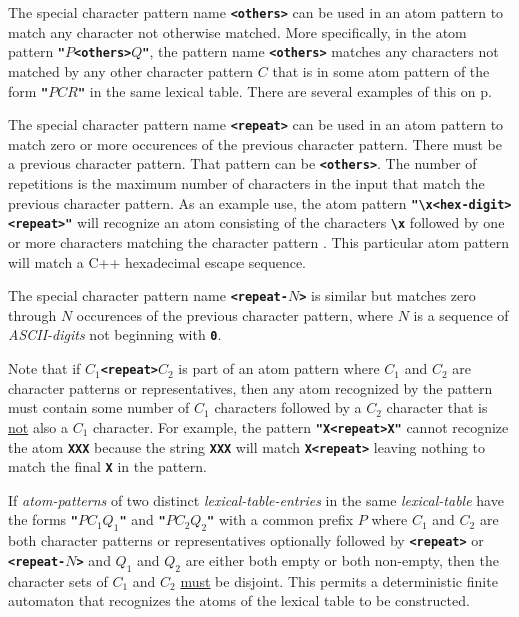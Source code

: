 \documentclass[12pt]{article}
\newcommand{\TT}[1]{{\tt \bfseries #1}}
\newcommand{\pagref}[1]{p\pageref{#1}}
\begin{document}
The special character pattern name
\TT{<{others}>}%
%
\label{<OTHERS>}
can be used in an atom pattern to match any character not otherwise
matched.  More specifically, in the atom pattern
\TT{"}$P$\TT{<others>}$Q$\TT{"},
the pattern name \TT{<others>} matches any characters not matched by
any other character pattern $C$ that is in some atom pattern of the form
\TT{"}$PCR$\TT{"} in the same lexical table.
There are several examples of this on \pagref{EXAMPLE-LEXEME-PROGRAM}.

The special character pattern name
\TT{<{repeat}>}%
%
\label{<REPEAT>}
can be used in an atom pattern to match zero or more occurences of
the previous character pattern.  There must be a previous character
pattern.  That pattern can be \TT{<others>}.
The number of repetitions is the maximum number of characters in
the input that match the previous character pattern.
As an example use, the atom pattern \TT{"\textbackslash x<hex-digit><repeat>"}
will recognize an atom consisting of the characters \TT{\textbackslash x}
followed by one or more characters matching the character pattern
\TT{<hex-digit>}.  This particular atom pattern will match a C++
hexadecimal escape sequence.

The special character pattern name
\TT{<{repeat-$N$}>}%
%
is similar but matches zero through $N$ occurences of the previous
character pattern, where $N$ is a sequence of {\em ASCII-digits}
not beginning with \TT{0}.

Note that if \TT{$C_1$<repeat>$C_2$} is part of an atom pattern where
$C_1$ and $C_2$ are character patterns or representatives, then
any atom recognized by the pattern must contain some number of
$C_1$ characters followed by a $C_2$ character that is \underline{not} also
a $C_1$ character.
For example, the pattern
\TT{"X<repeat>X"} cannot recognize the atom \TT{XXX} because the
string \TT{XXX} will match \TT{X<repeat>} leaving nothing to match
the final \TT{X} in the pattern.

If {\em atom-patterns} of two distinct {\em lexical-table-entries}
in the same {\em lexical-table} have the forms 
\TT{"}$PC_1Q_1$\TT{"} and \TT{"}$PC_2Q_2$\TT{"} with a common
prefix $P$ where
$C_1$ and $C_2$ are both character patterns or representatives
optionally followed
by \TT{<repeat>} or \TT{<repeat-$N$>} and
$Q_1$ and $Q_2$ are either both empty or both non-empty,
then the character sets of $C_1$ and $C_2$ \underline{must}
be disjoint.  This permits a deterministic finite automaton that
recognizes the atoms of the lexical table to be constructed.
\end{document}
